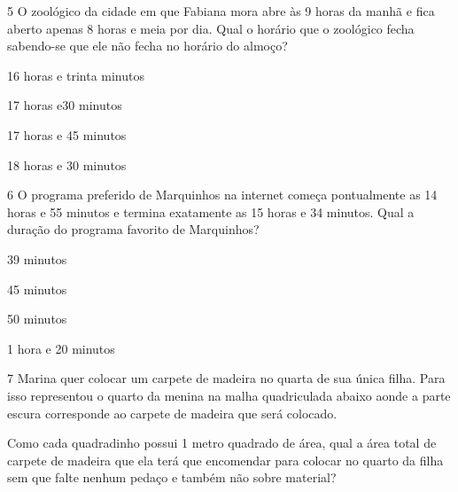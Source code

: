 
\num{5} O zoológico da cidade em que Fabiana mora abre às 9 horas da manhã
e fica aberto apenas 8 horas e meia por dia. Qual o horário que o
zoológico fecha sabendo-se que ele não fecha no horário do almoço?

\begin{escolha}
\item
  16 horas e trinta minutos
\item
  17 horas e30 minutos
\item
  17 horas e 45 minutos
\item
  18 horas e 30 minutos
\end{escolha}


\num{6} O programa preferido de Marquinhos na internet começa pontualmente
as 14 horas e 55 minutos e termina exatamente as 15 horas e 34 minutos.
Qual a duração do programa favorito de Marquinhos?

\begin{escolha}
\item
  39 minutos
\item
  45 minutos
\item
  50 minutos
\item
  1 hora e 20 minutos
\end{escolha}


\num{7} Marina quer colocar um carpete de madeira no quarta de sua única
filha. Para isso representou o quarto da menina na malha quadriculada
abaixo aonde a parte escura corresponde ao carpete de madeira que será
colocado.


Como cada quadradinho possui 1 metro quadrado de área, qual a área total
de carpete de madeira que ela terá que encomendar para colocar no quarto
da filha sem que falte nenhum pedaço e também não sobre material?

